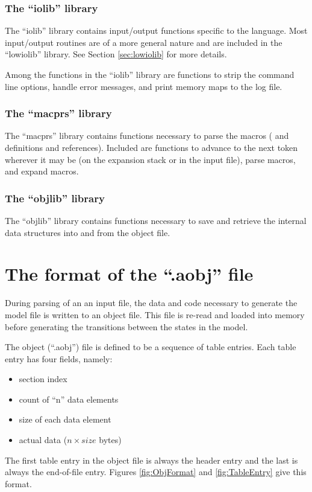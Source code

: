 \subsubsection{The ``iolib'' library}
\label{sec:iolib}
The ``iolib'' library contains input/output functions specific to the
 language.   Most input/output routines are of a
more general nature and are included in the ``lowiolib'' library.
See Section \ref{sec:lowiolib} for more details.

Among the functions in the ``iolib'' library are functions to
strip the  command line options, handle error messages,
and print memory maps to the log file.

\subsubsection{The ``macprs'' library}
\label{sec:macprs}
The ``macprs'' library contains functions necessary to parse
the  macros ( and  definitions
and references).  Included are functions to advance to the next token
wherever it may be (on the expansion stack or in the input file), parse
macros, and expand macros.

\subsubsection{The ``objlib'' library}
\label{sec:objlib}
The ``objlib'' library contains functions necessary to save and retrieve
the internal data structures into and from the object file.


\section{The format of the ``.aobj'' file}
\label{sec:aobj}

During parsing of an an  input file, the data and code
necessary to generate the model file is written to an object file.   This
file is re-read and loaded into memory before generating the transitions
between the states in the model.

The object (``.aobj'') file is defined to be a sequence of table entries.
Each table entry has four fields, namely:
\begin{itemize}
\item section index
\item count of ``n'' data elements
\item size of each data element
\item actual data ($ n \times size $ bytes)
\end{itemize}
The first table entry in the object file is always the header entry and
the last is always the end-of-file entry.
Figures \ref{fig:ObjFormat} and \ref{fig:TableEntry} give this format.

